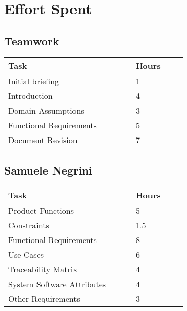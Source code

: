 \chapter{Effort Spent}
\vspace{-10mm}
\section{Teamwork}
\vspace{1mm}
\begin{center}
    \begin{tabular}{@{}p{0.5\linewidth} p{0.2\linewidth}@{}}
        \hline
        \textbf{Task} & \textbf{Hours} \\ \hline
        Initial briefing & 1 \\ \hline
        Introduction & 4 \\ \hline
        Domain Assumptions & 3 \\ \hline
        Functional Requirements & 5 \\ \hline
        Document Revision & 7 \\ \hline
    \end{tabular}
\end{center}

\section{Samuele Negrini}
\vspace{1mm}
\begin{center}
	\begin{tabular}{@{}p{0.5\linewidth} p{0.2\linewidth}@{}}
		\hline
		\textbf{Task} & \textbf{Hours} \\ \hline
		Product Functions & 5 \\ \hline
		Constraints & 1.5 \\ \hline
        Functional Requirements & 8 \\ \hline
        Use Cases & 6 \\ \hline
        Traceability Matrix & 4 \\ \hline
        System Software Attributes & 4 \\ \hline
        Other Requirements & 3 \\ \hline
	\end{tabular}
\end{center}

